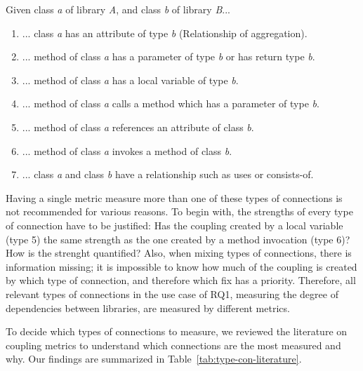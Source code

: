\blankls
Given class \textit{a} of library \textit{A}, and class \textit{b} of library \textit{B}...

\begin{enumerate}
  \item ... class \textit{a} has an attribute of type \textit{b} (Relationship of aggregation).
  \item ... method of class \textit{a} has a parameter of type \textit{b} or has return type \textit{b}.
  \item ... method of class \textit{a} has a local variable of type \textit{b}.
  \item ... method of class \textit{a} calls a method which has a parameter of type \textit{b}.
  \item ... method of class \textit{a} references an attribute of class \textit{b}.
  \item ... method of class \textit{a} invokes a method of class \textit{b}.
  \item ... class \textit{a} and class \textit{b} have a relationship such as uses or consists-of.
\end{enumerate}

Having a single metric measure more than one of these types of connections is not recommended for various reasons. To begin with, the strengths of every type of connection have to be justified: Has the coupling created by a local variable (type 5) the same strength as the one created by a method invocation (type 6)? How is the strenght quantified? Also, when mixing types of connections, there is information missing; it is impossible to know how much of the coupling is created by which type of connection, and therefore which fix has a priority. Therefore, all relevant types of connections in the use case of RQ1, measuring the degree of dependencies between libraries, are measured by different metrics.

To decide which types of connections to measure, we reviewed the literature on coupling metrics to understand which connections are the most measured and why. Our findings are summarized in Table~\ref{tab:type-con-literature}.


